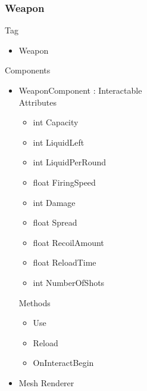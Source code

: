 \documentclass[11pt]{article}
\begin{document}
\subsubsection{Weapon}
Tag
\begin{itemize}
\item Weapon
\end{itemize}
Components
\begin{itemize}
\item WeaponComponent : Interactable
\\Attributes
\begin{itemize}
\item int Capacity
\item int LiquidLeft
\item int LiquidPerRound
\item float FiringSpeed
\item int Damage
\item float Spread
\item float RecoilAmount
\item float ReloadTime
\item int NumberOfShots
\end{itemize}
Methods
\begin{itemize}
\item Use
\item Reload
\item OnInteractBegin
\end{itemize}
\item Mesh Renderer
\end{itemize}
\end{document}
